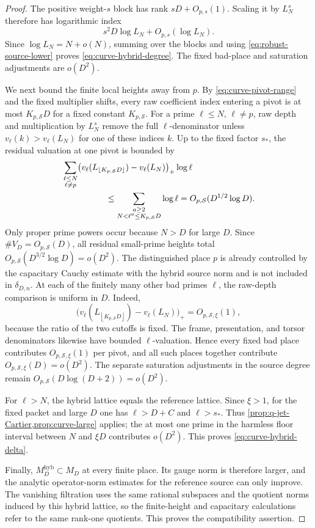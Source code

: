 \documentclass[11pt]{article}
\theoremstyle{definition}
\theoremstyle{remark}
\newcommand{\floor}[1]{\left\lfloor #1\right\rfloor}
\begin{document}
\begin{proof}
The positive weight-$s$ block has rank $sD+O_{p,s}(1)$.  Scaling it by
$L_N^s$ therefore has logarithmic index
\[
 s^2D\log L_N+O_{p,s}(\log L_N).
\]
Since $\log L_N=N+o(N)$, summing over the blocks and using
\eqref{eq:robust-source-lower} proves
\eqref{eq:curve-hybrid-degree}.  The fixed bad-place and saturation
adjustments are $o(D^2)$.

We next bound the finite local heights away from $p$.  By
\eqref{eq:curve-pivot-range} and the fixed multiplier shifts, every raw
coefficient index entering a pivot is at most $K_{p,\mathcal S}D$ for a fixed
constant $K_{p,\mathcal S}$.  For a prime $\ell\le N$, $\ell\ne p$, raw depth
and multiplication by $L_N^s$ remove the full $\ell$-denominator unless
$v_\ell(k)>v_\ell(L_N)$ for one of these indices $k$.  Up to the fixed factor
$s_*$, the residual valuation at one pivot is bounded by
\begin{align*}
 &\sum_{\substack{\ell\le N\\\ell\ne p}}
 \bigl(v_\ell(L_{\lfloor K_{p,\mathcal S}D\rfloor})
       -v_\ell(L_N)\bigr)_+\log\ell\\
 &\hspace{18mm}\le
 \sum_{\substack{a\ge2\\N<\ell^a\le K_{p,\mathcal S}D}}\log\ell
 =O_{p,\mathcal S}(D^{1/2}\log D).
\end{align*}
Only proper prime powers occur because $N> D$ for large $D$.  Since
$\#V_D=O_{p,\mathcal S}(D)$, all residual small-prime heights total
$O_{p,\mathcal S}(D^{3/2}\log D)=o(D^2)$.  The distinguished place $p$ is
already controlled by the capacitary Cauchy estimate with the hybrid source
norm and is not included in $\delta_{D,n}$.  At each of the finitely many other bad primes $\ell$, the raw-depth
comparison is uniform in $D$.  Indeed,
\[
 \bigl(v_\ell(L_{\floor{K_{p,\mathcal S}D}})-v_\ell(L_N)\bigr)_+
 =O_{p,\mathcal S,\xi}(1),
\]
because the ratio of the two cutoffs is fixed.  The frame, presentation, and
torsor denominators likewise have bounded $\ell$-valuation.  Hence every
fixed bad place contributes $O_{p,\mathcal S,\xi}(1)$ per pivot, and all
such places together contribute $O_{p,\mathcal S,\xi}(D)=o(D^2)$.  The
separate saturation adjustments in the source degree remain
$O_{p,\mathcal S}(D\log(D+2))=o(D^2)$.

For $\ell>N$, the hybrid lattice equals the reference lattice.  Since
$\xi>1$, for the fixed packet and large $D$ one has $\ell>D+C$ and
$\ell>s_*$.  Thus
\cref{prop:q-jet-Cartier,prop:curve-large} applies; the at most one prime in
the harmless floor interval between $N$ and $\xi D$ contributes $o(D^2)$.
This proves \eqref{eq:curve-hybrid-delta}.

Finally, $M_D^{\mathrm{hyb}}\subset M_D$ at every finite place.  Its gauge
norm is therefore larger, and the analytic operator-norm estimates for the
reference source can only improve.  The vanishing filtration uses the same
rational subspaces and the quotient norms induced by this hybrid lattice, so
the finite-height and capacitary calculations refer to the same rank-one
quotients.  This proves the compatibility assertion.
\end{proof}
\end{document}
